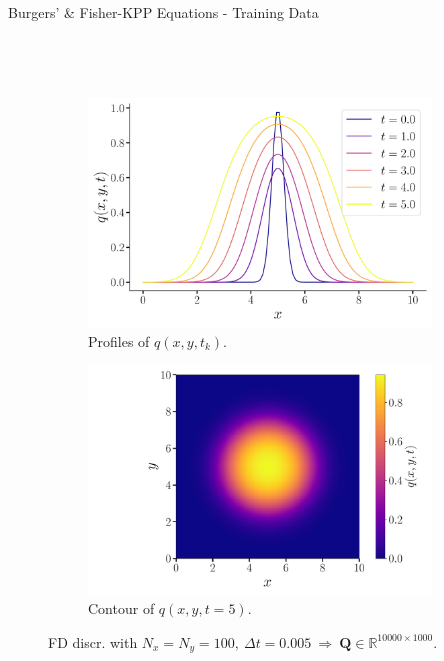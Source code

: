 \begin{frame}{Burgers' \& Fisher-KPP Equations - Training Data}
\begin{columns}[T,onlytextwidth]
\begin{figure}
\begin{subfigure}[t]{\textwidth}
        \label{fig:fisher-init}
      \end{subfigure}
      \\[1em]
      \begin{subfigure}[t]{0.48\textwidth}
        \centering
        \includegraphics[width=\textwidth]{images/1Dfkpp.pdf}
        \caption{Profiles of \(q(x,y,t_k)\).}
        \label{fig:fisher-mid}
      \end{subfigure}
      \hfill
      \begin{subfigure}[t]{0.48\textwidth}
        \centering
        \includegraphics[width=\textwidth]{images/2Dfkpp.pdf}
        \caption{Contour of \(q(x,y,t=5)\).}
        \label{fig:fisher-final}
      \end{subfigure}
      \caption*{FD discr. with $N_x=N_y=100,~\Delta t = 0.005 ~\!\!\Rightarrow\!\!~ \mathbf{Q}\in\mathbb{R}^{10000\times 1000}$.}
      \label{fig:fisher-data}
    \end{figure}
  \end{columns}
\end{frame}


